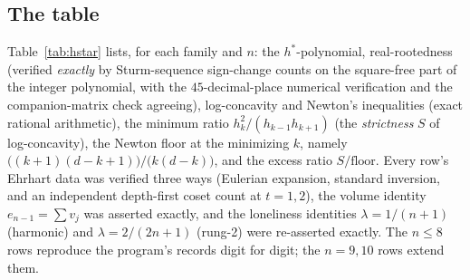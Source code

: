 \documentclass[11pt,a4paper]{article}
\numberwithin{equation}{section}
\theoremstyle{plain}
\theoremstyle{definition}
\theoremstyle{remark}
\begin{document}
\subsection{The table}

Table~\ref{tab:hstar} lists, for each family and $n$: the
$h^*$-polynomial, real-rootedness (verified \emph{exactly} by
Sturm-sequence sign-change counts on the square-free part of the integer
polynomial, with the $45$-decimal-place numerical verification and
the companion-matrix check agreeing), log-concavity and Newton's inequalities (exact rational
arithmetic), the minimum ratio $h_k^2/(h_{k-1}h_{k+1})$ (the
\emph{strictness} $S$ of log-concavity), the Newton floor at the
minimizing $k$, namely
$\bigl((k{+}1)(d{-}k{+}1)\bigr)/\bigl(k(d{-}k)\bigr)$,
and the excess ratio $S/\text{floor}$. Every row's Ehrhart data was
verified three ways (Eulerian expansion, standard inversion, and an
independent depth-first coset count at $t=1,2$), the volume identity
$e_{n-1}=\sum v_j$ was asserted exactly, and the loneliness identities
$\lambda=1/(n{+}1)$ (harmonic) and $\lambda=2/(2n{+}1)$ (rung-2) were
re-asserted exactly. The $n\le8$ rows reproduce the program's
records digit for digit; the $n=9,10$ rows extend them.
\end{document}

